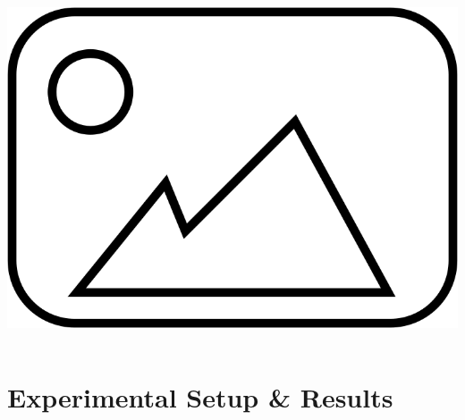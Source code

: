 \documentclass[aspectratio=169,10pt]{beamer}
\begin{document}
\begin{frame}
\begin{columns}[T]
\begin{column}{0.15\textwidth}
            \centering
            \includegraphics[width=\textwidth]{placeholder.png} %
            
        \end{column}
    \end{columns}
\end{frame}

\section{Experimental Setup \& Results}
\end{document}
